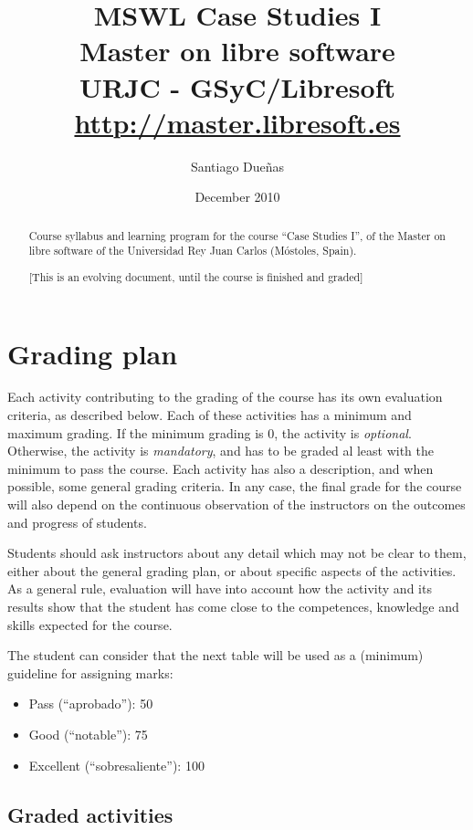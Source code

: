 \documentclass[a4paper]{article}
\title{MSWL Case Studies I \\
Master on libre software \\
URJC - GSyC/Libresoft \\
\url{http://master.libresoft.es}}
\author{Santiago Dueñas}
\date{December 2010}
\begin{document}
\maketitle

\begin{abstract}
Course syllabus and learning program for the course ``Case Studies I'', 
of the Master on libre software of the Universidad Rey Juan Carlos (Móstoles, Spain).

[This is an evolving document, until the course is finished and graded]
\end{abstract}

\tableofcontents

\section{Grading plan}

Each activity contributing to the grading of the course has its own evaluation criteria, 
as described below. Each of these activities has a minimum and maximum grading. If the 
minimum grading is 0, the activity is \textit{optional}. Otherwise, the activity is \textit{mandatory}, and 
has to be graded al least with the minimum to pass the course. Each activity has also a 
description, and when possible, some general grading criteria. In any case, the final grade 
for the course will also depend on the continuous observation of the instructors on the 
outcomes and progress of students.

Students should ask instructors about any detail which may not be clear to them, 
either about the general grading plan, or about specific aspects of the activities. 
As a general rule, evaluation will have into account how the activity and its results 
show that the student has come close to the competences, knowledge and skills expected 
for the course.

The student can consider that the next table will be used as a (minimum) guideline for 
assigning marks:

\begin{itemize}
\item Pass (``aprobado''): 50
\item Good (``notable''): 75
\item Excellent (``sobresaliente''): 100
\end{itemize}

\subsection{Graded activities}
\end{document}
